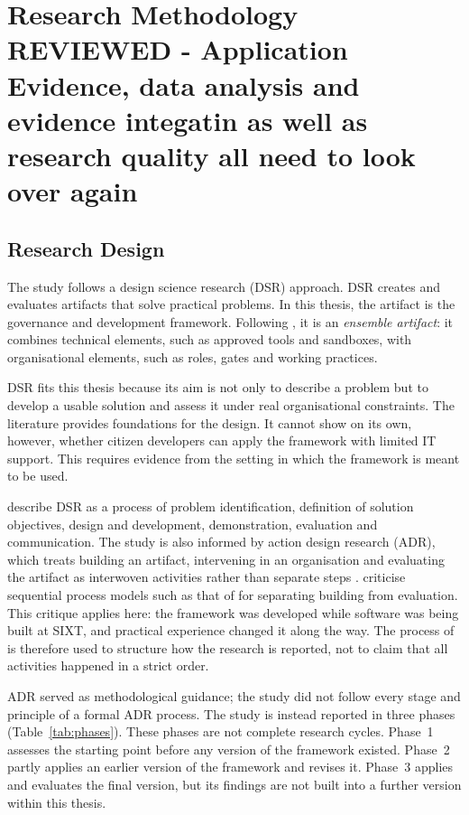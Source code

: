 \documentclass[10pt,a4paper]{article}
\begin{document}
\section{Research Methodology REVIEWED -  Application Evidence, data analysis and evidence integatin as well as research quality all need to look over again }
\label{sec:research-methodology}

\subsection{Research Design}
\label{sec:method-design}
 
The study follows a design science research (DSR) approach. DSR creates
and evaluates artifacts that solve practical problems. In this thesis,
the artifact is the governance and development framework. Following
\textcite{sein2011adr}, it is an \emph{ensemble artifact}: it combines
technical elements, such as approved tools and sandboxes, with
organisational elements, such as roles, gates and working practices.

DSR fits this thesis because its aim is not only to describe a problem
but to develop a usable solution and assess it under real
organisational constraints. The literature provides foundations for the
design. It cannot show on its own, however, whether citizen developers
can apply the framework with limited IT support. This requires evidence
from the setting in which the framework is meant to be used.

\textcite{peffers2007dsrm} describe DSR as a process of problem
identification, definition of solution objectives, design and
development, demonstration, evaluation and communication. The study is
also informed by action design research (ADR), which treats building an
artifact, intervening in an organisation and evaluating the artifact as
interwoven activities rather than separate steps \parencite{sein2011adr}.
\textcite{sein2011adr} criticise sequential process models such as that
of \textcite{peffers2007dsrm} for separating building from evaluation.
This critique applies here: the framework was developed while software
was being built at SIXT, and practical experience changed it along the
way. The process of \textcite{peffers2007dsrm} is therefore used to
structure how the research is reported, not to claim that all
activities happened in a strict order.

ADR served as methodological guidance; the study did not follow every
stage and principle of a formal ADR process. The study is instead
reported in three phases (Table~\ref{tab:phases}). These phases are not
complete research cycles. Phase~1 assesses the starting point before
any version of the framework existed. Phase~2 partly applies an earlier
version of the framework and revises it.
Phase~3 applies and evaluates the final version, but its findings are
not built into a further version within this thesis.
 
\end{document}
